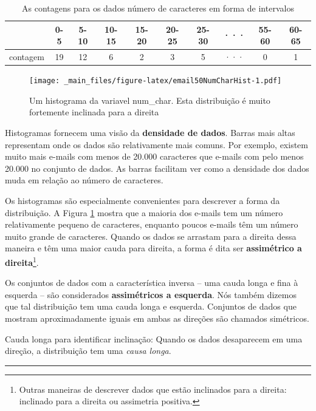 \documentclass[
]{book}
\theoremstyle{definition}
\theoremstyle{definition}
\theoremstyle{definition}
\theoremstyle{definition}
\theoremstyle{remark}
\begin{document}
\begin{table}

\caption{\label{tab:binnedNumCharTable}As contagens para os dados número de caracteres em forma de intervalos}
\centering
\begin{tabular}[t]{l|c|c|c|c|c|c|c|c|c}
\hline
  & 0-5 & 5-10 & 10-15 & 15-20 & 20-25 & 25-30 & ··· & 55-60 & 60-65\\
\hline
contagem & 19 & 12 & 6 & 2 & 3 & 5 & ··· & 0 & 1\\
\hline
\end{tabular}
\end{table}

\begin{figure}
\centering
\texttt{[image: \_main\_files/figure-latex/email50NumCharHist-1.pdf]}
\caption{\label{fig:email50NumCharHist}Um histograma da variavel num\_char. Esta distribuição é muito fortemente inclinada para a direita}
\end{figure}

Histogramas fornecem uma visão da \textbf{densidade de dados}. Barras mais altas representam onde os dados são relativamente mais comuns. Por exemplo, existem muito mais e-mails com menos de 20.000 caracteres que e-mails com pelo menos 20.000 no conjunto de dados. As barras facilitam ver como a densidade dos dados muda em relação ao número de caracteres.

Os histogramas são especialmente convenientes para descrever a forma da distribuição. A Figura \ref{fig:email50NumCharHist} mostra que a maioria dos e-mails tem um número relativamente pequeno de caracteres, enquanto poucos e-mails têm um número muito grande de caracteres. Quando os dados se arrastam para a direita dessa maneira e têm uma maior cauda para direita, a forma é dita ser \textbf{assimétrico a direita}\footnote{Outras maneiras de descrever dados que estão inclinados para a direita: inclinado para a direita ou assimetria positiva.}.

Os conjuntos de dados com a característica inversa -- uma cauda longa e fina à esquerda -- são considerados \textbf{assimétricos a esquerda}. Nós também dizemos que tal distribuição tem uma cauda longa e esquerda. Conjuntos de dados que mostram aproximadamente iguais em ambas as direções são chamados simétricos.

Cauda longa para identificar inclinação: Quando os dados desaparecem em uma direção, a distribuição tem uma \emph{causa longa}.

\begin{center}\rule{0.5\linewidth}{0.5pt}\end{center}
\end{document}
